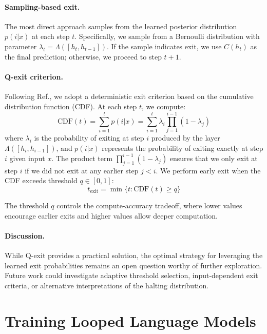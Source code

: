 \documentclass[]{bytedance_seed}
\newcommand{\1}{\mathbf{1}}
\begin{document}
\paragraph{Sampling-based exit.} The most direct approach samples from the learned posterior distribution $p(i|x)$ at each step $t$. Specifically, we sample from a Bernoulli distribution with parameter $\lambda_t = \Lambda([h_t, h_{t-1}])$. If the sample indicates exit, we use $C(h_t)$ as the final prediction; otherwise, we proceed to step $t+1$.

\paragraph{Q-exit criterion.} Following Ref.\cite{balagansky2022palbert}, we adopt a deterministic exit criterion based on the cumulative distribution function (CDF). At each step $t$, we compute:
$$
\text{CDF}(t) = \sum_{i=1}^{t} p(i|x) = \sum_{i=1}^{t} \lambda_i \prod_{j=1}^{i-1}(1 - \lambda_j)
$$
where $\lambda_i$ is the probability of exiting at step $i$ produced by the layer $\Lambda([h_i, h_{i-1}])$, and $p(i|x)$ represents the probability of exiting exactly at step $i$ given input $x$. The product term $\prod_{j=1}^{i-1}(1 - \lambda_j)$ ensures that we only exit at step $i$ if we did not exit at any earlier step $j < i$. We perform early exit when the CDF exceeds threshold $q \in [0,1]$:
$$
t_{\text{exit}} = \min\{t : \text{CDF}(t) \geq q\}
$$

 The threshold $q$ controls the compute-accuracy tradeoff, where lower values encourage earlier exits and higher values allow deeper computation.

\paragraph{Discussion.} While Q-exit provides a practical solution, the optimal strategy for leveraging the learned exit probabilities remains an open question worthy of further exploration. Future work could investigate adaptive threshold selection, input-dependent exit criteria, or alternative interpretations of the halting distribution.




\section{Training Looped Language Models}
\end{document}
